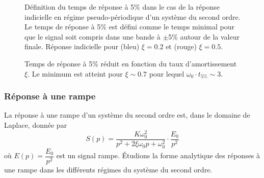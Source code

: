 \begin{figure}[!h]
    \centering
    
    \caption{Définition du temps de réponse à 5\% dans le cas de la 
    réponse indicielle en régime pseudo-périodique d'un système du 
    second ordre. Le temps de réponse à 5\% est défini comme le 
    temps minimal pour que le signal soit compris dans une bande 
    à $\pm$5\% autour de la valeur finale. Réponse indicielle 
    pour (bleu) $\xi=0.2$ et (rouge) $\xi=0.5$.\label{fig-2nd_t5pc} }
\end{figure}
\begin{figure}[!b]
\centering
    
    \caption{Temps de réponse à 5\% réduit en fonction du taux 
             d'amortissement $\xi$. Le minimum est atteint pour $\xi\sim0.7$ 
             pour lequel $\omega_0\cdot t_{5\%}\sim3$.
             \label{fig-2nd_temps_reponse}}
\end{figure}

{\tikzset{external/export=false}

}
\restoregeometry
\subsubsection{Réponse à une rampe}
La réponse à une rampe d'un système du second ordre est, dans le domaine 
de Laplace, donnée par
\[
S(p)=\dfrac{K\omega_0^2}{p^2+2\xi\omega_0p+\omega_0^2}\cdot\dfrac{E_0}{p^2}
\]
où $E(p)=\dfrac{E_0}{p^2}$ est un signal rampe.
\'Etudions la forme analytique des réponses à une rampe dans les différents 
régimes du système du second ordre.
